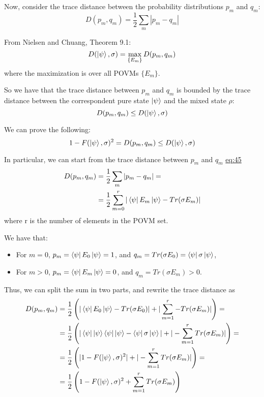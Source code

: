 \documentclass{masterthesis}
\begin{document}
Now, consider the trace distance between the probability distributions $p_m$ and $q_m$:
\begin{equation}\label{eq:trace-dist}
    D(p_m, q_m) = \frac{1}{2} \sum_{m} |p_m - q_m|
\end{equation}

From Nielsen and Chuang, Theorem 9.1:
\begin{equation}
    D(\ket{\psi}, \sigma) = \max_{\{E_m\}} D(p_m, q_m)
\end{equation}
where the maximization is over all POVMs $\{E_m\}$.

So we have that the trace distance between $p_m$ and $q_m$ is bounded by the trace distance between the correspondent pure state $\ket{\psi}$ and the mixed state $\rho$:
\begin{equation}
    D(p_m, q_m) \leq D(\ket{\psi}, \sigma)
\end{equation}

We can prove the following:
\begin{equation}
    1 - F(\ket{\psi}, \sigma)^2 = D(p_m, q_m) \leq D(\ket{\psi}, \sigma)
\end{equation}

In particular, we can start from the trace distance between $p_m$ and $q_m$ \hyperref[eq:trace-dist]{eq:45}
\begin{align}
    D(p_m, q_m) &= \frac{1}{2} \sum_{m} |p_m - q_m| = \\
    &= \frac{1}{2} \sum_{m=0}^{r} |\bra{\psi}E_m\ket{\psi} - Tr(\sigma E_m)|
\end{align}
where r is the number of elements in the POVM set.

We have that:
\begin{itemize}
    \item For $m=0$, $p_m=\bra{\psi}E_0\ket{\psi} = 1$, and $q_m = Tr(\sigma E_0) = \bra{\psi} \sigma \ket{\psi}$,
    \item For $m>0$, $p_m=\bra{\psi}E_m\ket{\psi} = 0$, and $q_m=Tr(\sigma E_m) > 0$.
\end{itemize}

Thus, we can split the sum in two parts, and rewrite the trace distance as
\begin{align}
    D(p_m, q_m) &= \frac{1}{2} \left(|\bra{\psi}E_0\ket{\psi} - Tr(\sigma E_0)| + | \sum_{m=1}^{r} - Tr(\sigma E_m)|\right) = \\
    &= \frac{1}{2} \left(|\bra{\psi}\ket{\psi}\bra{\psi}\ket{\psi} - \bra{\psi} \sigma \ket{\psi} | + | - \sum_{m=1}^{r} Tr(\sigma E_m)|\right) = \\
    &= \frac{1}{2} \left(|1 - F(\ket{\psi}, \sigma)^2 | + | - \sum_{m=1}^{r} Tr(\sigma E_m)|\right) = \\
    &= \frac{1}{2} \left(1 - F(\ket{\psi}, \sigma)^2 + \sum_{m=1}^{r} Tr(\sigma E_m) \right)
\end{align}
\end{document}
